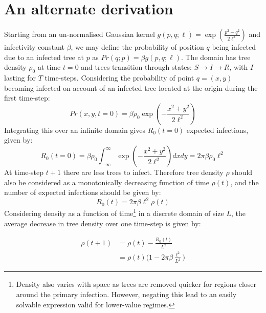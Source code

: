 \section{An alternate derivation}
\label{eq:alternate-R0}
Starting from an un-normalised Gaussian kernel $g(p, q; \ell) = \exp(\frac{p^2-q^2}{2\ell^2})$ and infectivity constant $\beta$, we may define the probability of position $q$ being infected due to an infected tree at $p$ as $Pr(q; p) = \beta g(p, q; \ell)$. The domain has tree density $\rho_0$ at time $t=0$ and trees transition through states: $S\rightarrow I\rightarrow R$, with $I$ lasting for $T$ time-steps. Considering the probability of point $q = (x, y)$ becoming infected on account of an infected tree located at the origin during the first time-step:
\begin{equation}
    Pr(x, y, t=0) = \beta \rho_0 \exp(-\frac{x^2+y^2}{2\ell^2})
\end{equation}{}
 Integrating this over an infinite domain gives $R_0(t=0)$ expected infections, given by:
\begin{equation}
    R_0(t = 0) = \beta \rho_0 \int^{\infty}_{-\infty} \exp(-\frac{x^2+y^2}{2\ell^2})dx dy= 2\pi\beta\rho_0\ell^2
\end{equation}{}
At time-step $t+1$ there are less trees to infect. Therefore tree density $\rho$ should also be considered as a monotonically decreasing function of time $\rho(t)$, and the number of expected infections should be given by:
\begin{equation}
    R_0(t) = 2\pi\beta\ell^2\rho(t)
    \label{eq:r0-A}
\end{equation}{}
 Considering density as a function of time\footnote{Density also varies with space as trees are removed quicker for regions closer around the primary infection. However, negating this lead to an easily solvable expression valid for lower-value regimes.} in a discrete domain of size $L$, the average decrease in tree density over one time-step is given by:

\begin{equation}
\label{eq:discrete-rho-t-A}
\begin{split}
\rho(t+1) & = \rho(t) - \frac{R_0(t)}{L^2} \\
 & = \rho(t)\Big(1 - 2\pi\beta\frac{\ell^2}{L^2} \Big)
\end{split}
\end{equation}

